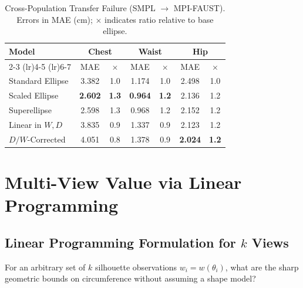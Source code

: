 \documentclass[journal]{IEEEtran}
\begin{document}
\begin{table}[!t]
\caption{Cross-Population Transfer Failure (SMPL $\to$ MPI-FAUST). Errors in MAE (cm); $\times$ indicates ratio relative to base ellipse.}
\label{tab:smpl_transfer}
\centering
\begin{tabular}{lcccccc}
\toprule
\multirow{2}{*}{\textbf{Model}} & \multicolumn{2}{c}{\textbf{Chest}} & \multicolumn{2}{c}{\textbf{Waist}} & \multicolumn{2}{c}{\textbf{Hip}} \\
\cmidrule(lr){2-3} \cmidrule(lr){4-5} \cmidrule(lr){6-7}
& MAE & $\times$ & MAE & $\times$ & MAE & $\times$ \\
\midrule
Standard Ellipse & 3.382 & 1.0 & 1.174 & 1.0 & 2.498 & 1.0 \\
Scaled Ellipse & \textbf{2.602} & \textbf{1.3} & \textbf{0.964} & \textbf{1.2} & 2.136 & 1.2 \\
Superellipse & 2.598 & 1.3 & 0.968 & 1.2 & 2.152 & 1.2 \\
Linear in $W, D$ & 3.835 & 0.9 & 1.337 & 0.9 & 2.123 & 1.2 \\
$D/W$-Corrected & 4.051 & 0.8 & 1.378 & 0.9 & \textbf{2.024} & \textbf{1.2} \\
\bottomrule
\end{tabular}
\end{table}

\section{Multi-View Value via Linear Programming}
\label{sec:multiview_lp}

\subsection{Linear Programming Formulation for $k$ Views}
For an arbitrary set of $k$ silhouette observations $w_i = w(\theta_i)$, what are the sharp geometric bounds on circumference without assuming a shape model?
\end{document}

